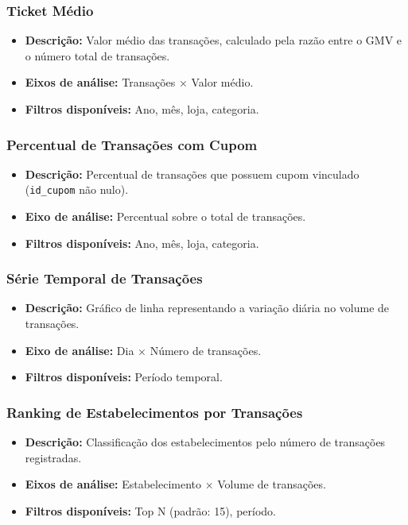 \documentclass[12pt]{article}
\begin{document}
\subsubsection{Ticket Médio}
\begin{itemize}
    \item \textbf{Descrição:} Valor médio das transações, calculado pela razão entre o GMV e o número total de transações.
    \item \textbf{Eixos de análise:} Transações × Valor médio.
    \item \textbf{Filtros disponíveis:} Ano, mês, loja, categoria.
\end{itemize}

\subsubsection{Percentual de Transações com Cupom}
\begin{itemize}
    \item \textbf{Descrição:} Percentual de transações que possuem cupom vinculado (\texttt{id\_cupom} não nulo).
    \item \textbf{Eixo de análise:} Percentual sobre o total de transações.
    \item \textbf{Filtros disponíveis:} Ano, mês, loja, categoria.
\end{itemize}

\subsubsection{Série Temporal de Transações}
\begin{itemize}
    \item \textbf{Descrição:} Gráfico de linha representando a variação diária no volume de transações.
    \item \textbf{Eixo de análise:} Dia × Número de transações.
    \item \textbf{Filtros disponíveis:} Período temporal.
\end{itemize}

\subsubsection{Ranking de Estabelecimentos por Transações}
\begin{itemize}
    \item \textbf{Descrição:} Classificação dos estabelecimentos pelo número de transações registradas.
    \item \textbf{Eixos de análise:} Estabelecimento × Volume de transações.
    \item \textbf{Filtros disponíveis:} Top N (padrão: 15), período.
\end{itemize}
\end{document}
